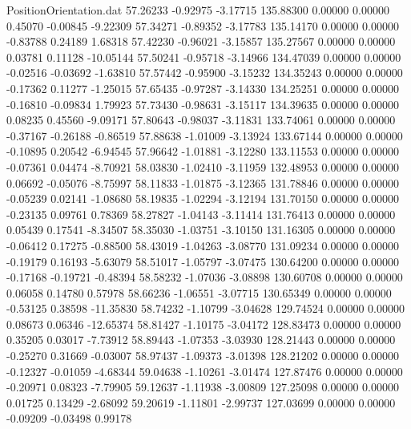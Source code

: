 \begin{filecontents}{PositionOrientation.dat}
  57.26233   -0.92975   -3.17715   135.88300    0.00000    0.00000    0.45070   -0.00845   -9.22309
  57.34271   -0.89352   -3.17783   135.14170    0.00000    0.00000   -0.83788    0.24189    1.68318
  57.42230   -0.96021   -3.15857   135.27567    0.00000    0.00000    0.03781    0.11128  -10.05144
  57.50241   -0.95718   -3.14966   134.47039    0.00000    0.00000   -0.02516   -0.03692   -1.63810
  57.57442   -0.95900   -3.15232   134.35243    0.00000    0.00000   -0.17362    0.11277   -1.25015
  57.65435   -0.97287   -3.14330   134.25251    0.00000    0.00000   -0.16810   -0.09834    1.79923
  57.73430   -0.98631   -3.15117   134.39635    0.00000    0.00000    0.08235    0.45560   -9.09171
  57.80643   -0.98037   -3.11831   133.74061    0.00000    0.00000   -0.37167   -0.26188   -0.86519
  57.88638   -1.01009   -3.13924   133.67144    0.00000    0.00000   -0.10895    0.20542   -6.94545
  57.96642   -1.01881   -3.12280   133.11553    0.00000    0.00000   -0.07361    0.04474   -8.70921
  58.03830   -1.02410   -3.11959   132.48953    0.00000    0.00000    0.06692   -0.05076   -8.75997
  58.11833   -1.01875   -3.12365   131.78846    0.00000    0.00000   -0.05239    0.02141   -1.08680
  58.19835   -1.02294   -3.12194   131.70150    0.00000    0.00000   -0.23135    0.09761    0.78369
  58.27827   -1.04143   -3.11414   131.76413    0.00000    0.00000    0.05439    0.17541   -8.34507
  58.35030   -1.03751   -3.10150   131.16305    0.00000    0.00000   -0.06412    0.17275   -0.88500
  58.43019   -1.04263   -3.08770   131.09234    0.00000    0.00000   -0.19179    0.16193   -5.63079
  58.51017   -1.05797   -3.07475   130.64200    0.00000    0.00000   -0.17168   -0.19721   -0.48394
  58.58232   -1.07036   -3.08898   130.60708    0.00000    0.00000    0.06058    0.14780    0.57978
  58.66236   -1.06551   -3.07715   130.65349    0.00000    0.00000   -0.53125    0.38598  -11.35830
  58.74232   -1.10799   -3.04628   129.74524    0.00000    0.00000    0.08673    0.06346  -12.65374
  58.81427   -1.10175   -3.04172   128.83473    0.00000    0.00000    0.35205    0.03017   -7.73912
  58.89443   -1.07353   -3.03930   128.21443    0.00000    0.00000   -0.25270    0.31669   -0.03007
  58.97437   -1.09373   -3.01398   128.21202    0.00000    0.00000   -0.12327   -0.01059   -4.68344
  59.04638   -1.10261   -3.01474   127.87476    0.00000    0.00000   -0.20971    0.08323   -7.79905
  59.12637   -1.11938   -3.00809   127.25098    0.00000    0.00000    0.01725    0.13429   -2.68092
  59.20619   -1.11801   -2.99737   127.03699    0.00000    0.00000   -0.09209   -0.03498    0.99178

\end{filecontents}
